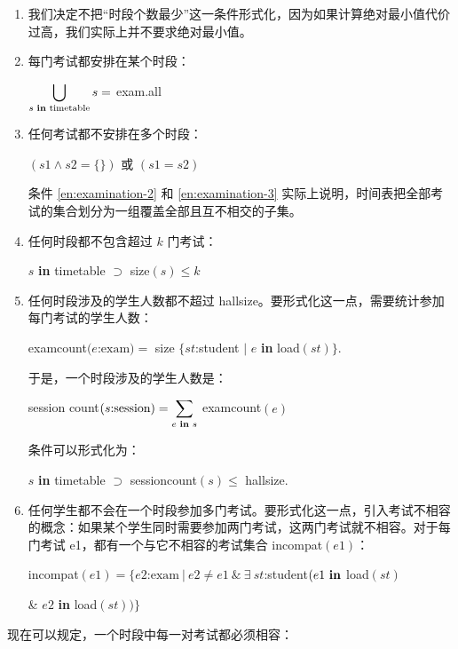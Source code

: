 \documentclass[twoside,11pt,fontset=none]{ctexbook}
\begin{document}
\begin{enumerate}[wide, nosep, label=(\arabic*)]
	\item \label{en:examination-1}
	我们决定不把“时段个数最少”这一条件形式化，因为如果计算绝对最小值代价过高，我们实际上并不要求绝对最小值。

	\item \label{en:examination-2}
	每门考试都安排在某个时段：

	$\displaystyle\bigcup_{s\text{ \textbf{in} timetable}} s =$ exam.all
	\smallskip

	\item \label{en:examination-3}
	任何考试都不安排在多个时段：

	\quad $(s1 \wedge s2 = \{\})$ 或 $(s1 = s2)$

	\noindent
	条件 \ref{en:examination-2} 和 \ref{en:examination-3} 实际上说明，时间表把全部考试的集合划分为一组覆盖全部且互不相交的子集。

	\item \label{en:examination-4}
	任何时段都不包含超过 $k$ 门考试：

	\quad $s$ \textbf{in} timetable $\supset$ size$(s) \leqslant k$

	\item \label{en:examination-5}
	任何时段涉及的学生人数都不超过 hallsize。要形式化这一点，需要统计参加每门考试的学生人数：
	
	\quad examcount$(e$:$\text{exam}) = $ size $\{st$:student $\mid$ $e$ \textbf{in} load$(st)\}$.
	
	于是，一个时段涉及的学生人数是：
	
	\quad session count$(s\text{:session}) = \displaystyle\sum_{e \text{ \textbf{in} } s}$ examcount$(e)$
	
	条件可以形式化为：
	
	\quad $s$ \textbf{in} timetable $\supset$ sessioncount$(s) \leqslant$ hallsize.
	
	\item \label{en:examination-6}
	任何学生都不会在一个时段参加多门考试。要形式化这一点，引入考试不相容的概念：如果某个学生同时需要参加两门考试，这两门考试就不相容。对于每门考试 e1，都有一个与它不相容的考试集合 incompat$(e1)$：
	
	\quad incompat$(e1)= \{e2\text{:exam}\ |\ e2 \neq e1\ \&\ \exists\ st$:student$(e1 \text{ \textbf{in}}$ load$(st)$
		
	\tabto*{8.2em} \& $e2$ \textbf{in} load$(st))\}$
\end{enumerate}

\noindent
现在可以规定，一个时段中每一对考试都必须相容：
\end{document}
